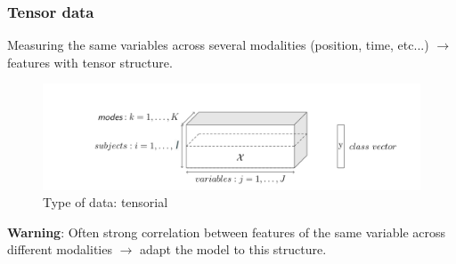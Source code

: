 \documentclass{beamer}
\begin{document}



    






\begin{frame}
    \frametitle{Tensor data}
  Measuring the same variables across several modalities (position, time, etc...) $\rightarrow$ features with tensor structure.
    \begin{figure}
        \centering
        \includegraphics[scale = 0.23]{images/tensor_mode.png}
        \caption{Type of data: tensorial}
    \end{figure}

\textbf{Warning}: Often strong correlation between features of the same variable across different modalities $\rightarrow$ adapt the model to this structure.
\end{frame}
\end{document}
